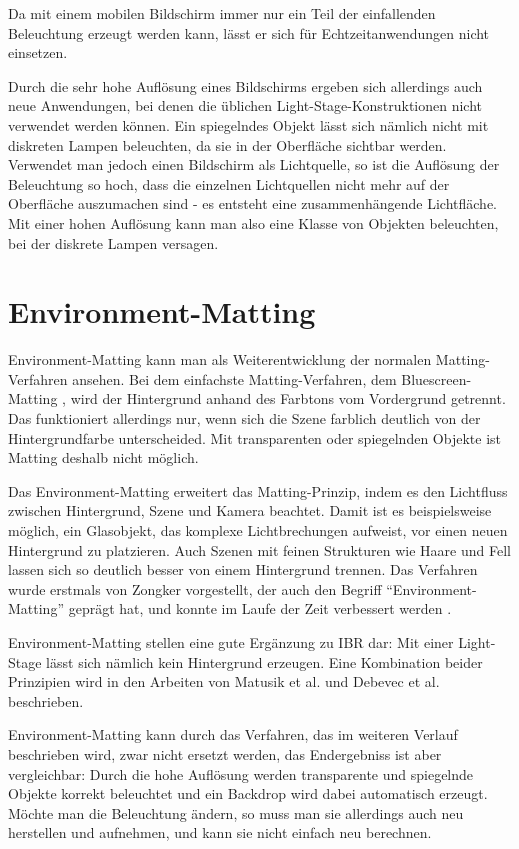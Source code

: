   Da mit einem mobilen Bildschirm immer nur ein Teil der einfallenden Beleuchtung erzeugt werden kann, lässt er sich für Echtzeitanwendungen nicht einsetzen.
   
  Durch die sehr hohe Auflösung eines Bildschirms ergeben sich allerdings auch neue Anwendungen, bei denen die üblichen Light-Stage-Konstruktionen nicht verwendet werden können.
  Ein spiegelndes Objekt lässt sich nämlich nicht mit diskreten Lampen beleuchten, da sie in der Oberfläche sichtbar werden.
  Verwendet man jedoch einen Bildschirm als Lichtquelle, so ist die Auflösung der Beleuchtung so hoch, dass die einzelnen Lichtquellen nicht mehr auf der Oberfläche auszumachen sind - es entsteht eine zusammenhängende Lichtfläche. 
  Mit einer hohen Auflösung kann man also eine Klasse von Objekten beleuchten, bei der diskrete Lampen versagen.

  

\section{Environment-Matting} \label{rel:envmatting}
  Environment-Matting kann man als Weiterentwicklung der normalen Matting-Verfahren ansehen.
  Bei dem einfachste Matting-Verfahren, dem Bluescreen-Matting \cite{Smith_1996}, wird der Hintergrund anhand des Farbtons vom Vordergrund getrennt.
  Das funktioniert allerdings nur, wenn sich die Szene farblich deutlich von der Hintergrundfarbe unterscheided. 
  Mit transparenten oder spiegelnden Objekte ist Matting deshalb nicht möglich.
 
  Das Environment-Matting erweitert das Matting-Prinzip, indem es den Lichtfluss zwischen Hintergrund, Szene und Kamera beachtet.
   Damit ist es beispielsweise möglich, ein Glasobjekt, das komplexe Lichtbrechungen aufweist, vor einen neuen Hintergrund zu platzieren.
  Auch Szenen mit feinen Strukturen wie Haare und Fell lassen sich so deutlich besser von einem Hintergrund trennen.
  Das Verfahren wurde erstmals von Zongker \cite{Zongker_1999} vorgestellt, der auch den Begriff ``Environment-Matting'' geprägt hat, und konnte im Laufe der Zeit verbessert werden \cite{Chuang_2000, Wexler_2002}.

  Environment-Matting stellen eine gute Ergänzung zu IBR dar: Mit einer Light-Stage lässt sich nämlich kein Hintergrund erzeugen.
  Eine Kombination beider Prinzipien wird in den Arbeiten von Matusik et al.  \cite{Matusik_2002} und Debevec et al. \cite{Debevec_2002} beschrieben.
   
  Environment-Matting kann durch das Verfahren, das im weiteren Verlauf beschrieben wird, zwar nicht ersetzt werden, das Endergebniss ist aber vergleichbar: 
  Durch die hohe Auflösung werden transparente und spiegelnde Objekte korrekt beleuchtet und ein Backdrop wird dabei automatisch erzeugt.
  Möchte man die Beleuchtung ändern, so muss man sie allerdings auch neu herstellen und aufnehmen, und kann sie nicht einfach neu berechnen.
